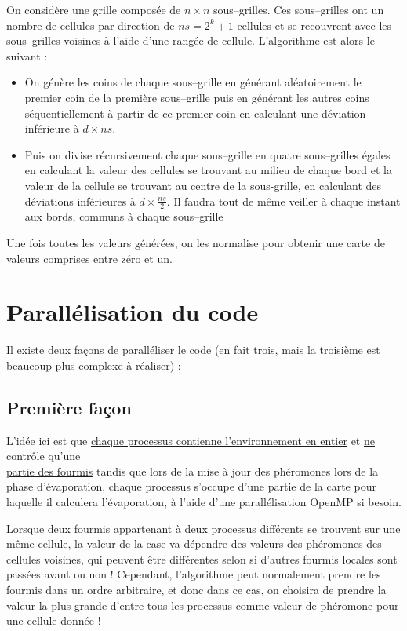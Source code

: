 \documentclass[a4]{article}
\begin{document}
On considère une grille composée de $n\times n$ sous--grilles. Ces sous--grilles ont un nombre de cellules par direction de
$ns=2^{k}+1$ cellules et se recouvrent avec les sous--grilles voisines à l'aide d'une rangée de cellule.
L'algorithme est alors le suivant :
\begin{itemize}
\item On génère les coins de chaque sous--grille en générant aléatoirement le premier coin de la première sous--grille puis en générant les autres coins séquentiellement à partir de ce premier coin en calculant une déviation inférieure à $d\times ns$.
\item Puis on divise récursivement chaque sous--grille en quatre sous--grilles égales en calculant la valeur des cellules se trouvant au milieu
de chaque bord et la valeur de la cellule se trouvant au centre de la sous-grille, en calculant des déviations inférieures à
$d\times \frac{ns}{2}$. Il faudra tout de même veiller à chaque instant aux bords, communs à chaque sous--grille
\end{itemize}

 Une fois toutes les valeurs générées, on les normalise pour obtenir une carte de
valeurs comprises entre zéro et un.

\section{Parallélisation du code}

Il existe deux façons de paralléliser le code (en fait trois, mais la troisième est beaucoup plus complexe à réaliser) :

\subsection{Première façon}

L'idée ici est que \underline{chaque processus contienne l'environnement en
  entier} 
et \underline{ne contrôle qu'une}\\\underline{partie des
  fourmis}\reversemarginpar{} tandis que lors de la mise à jour des phéromones lors de la phase d'évaporation, chaque processus s'occupe d'une partie de la carte pour laquelle il calculera l'évaporation, à l'aide d'une parallélisation OpenMP si besoin.

\reversemarginpar{}Lorsque deux fourmis
appartenant à deux processus différents se trouvent sur une même cellule, la
valeur de la case va dépendre des valeurs des phéromones des cellules voisines,
qui peuvent être différentes selon si d'autres fourmis locales sont passées
avant ou non ! Cependant, l'algorithme peut normalement prendre les fourmis dans
un ordre arbitraire, et donc dans ce cas, on choisira de prendre la valeur la
plus grande d'entre tous les processus comme valeur de phéromone pour une
cellule donnée !
\end{document}

